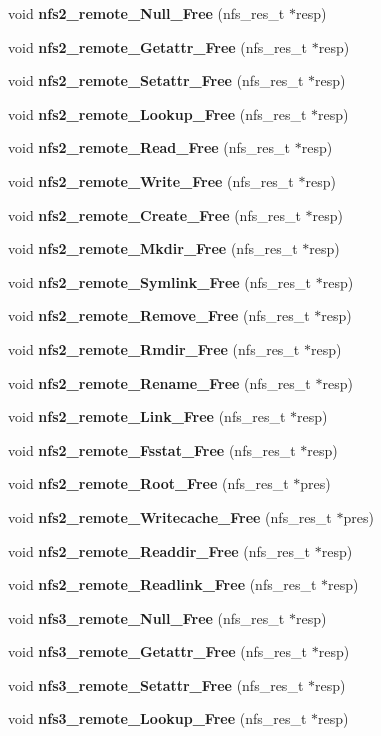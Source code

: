 \begin{DoxyCompactItemize}
\item 
void {\bf nfs2\_\-remote\_\-Null\_\-Free} (nfs\_\-res\_\-t $\ast$resp)
\item 
void {\bf nfs2\_\-remote\_\-Getattr\_\-Free} (nfs\_\-res\_\-t $\ast$resp)
\item 
void {\bf nfs2\_\-remote\_\-Setattr\_\-Free} (nfs\_\-res\_\-t $\ast$resp)
\item 
void {\bf nfs2\_\-remote\_\-Lookup\_\-Free} (nfs\_\-res\_\-t $\ast$resp)
\item 
void {\bf nfs2\_\-remote\_\-Read\_\-Free} (nfs\_\-res\_\-t $\ast$resp)
\item 
void {\bf nfs2\_\-remote\_\-Write\_\-Free} (nfs\_\-res\_\-t $\ast$resp)
\item 
void {\bf nfs2\_\-remote\_\-Create\_\-Free} (nfs\_\-res\_\-t $\ast$resp)
\item 
void {\bf nfs2\_\-remote\_\-Mkdir\_\-Free} (nfs\_\-res\_\-t $\ast$resp)
\item 
void {\bf nfs2\_\-remote\_\-Symlink\_\-Free} (nfs\_\-res\_\-t $\ast$resp)
\item 
void {\bf nfs2\_\-remote\_\-Remove\_\-Free} (nfs\_\-res\_\-t $\ast$resp)
\item 
void {\bf nfs2\_\-remote\_\-Rmdir\_\-Free} (nfs\_\-res\_\-t $\ast$resp)
\item 
void {\bf nfs2\_\-remote\_\-Rename\_\-Free} (nfs\_\-res\_\-t $\ast$resp)
\item 
void {\bf nfs2\_\-remote\_\-Link\_\-Free} (nfs\_\-res\_\-t $\ast$resp)
\item 
void {\bf nfs2\_\-remote\_\-Fsstat\_\-Free} (nfs\_\-res\_\-t $\ast$resp)
\item 
void {\bf nfs2\_\-remote\_\-Root\_\-Free} (nfs\_\-res\_\-t $\ast$pres)
\item 
void {\bf nfs2\_\-remote\_\-Writecache\_\-Free} (nfs\_\-res\_\-t $\ast$pres)
\item 
void {\bf nfs2\_\-remote\_\-Readdir\_\-Free} (nfs\_\-res\_\-t $\ast$resp)
\item 
void {\bf nfs2\_\-remote\_\-Readlink\_\-Free} (nfs\_\-res\_\-t $\ast$resp)
\item 
void {\bf nfs3\_\-remote\_\-Null\_\-Free} (nfs\_\-res\_\-t $\ast$resp)
\item 
void {\bf nfs3\_\-remote\_\-Getattr\_\-Free} (nfs\_\-res\_\-t $\ast$resp)
\item 
void {\bf nfs3\_\-remote\_\-Setattr\_\-Free} (nfs\_\-res\_\-t $\ast$resp)
\item 
void {\bf nfs3\_\-remote\_\-Lookup\_\-Free} (nfs\_\-res\_\-t $\ast$resp)

\end{DoxyCompactItemize}
